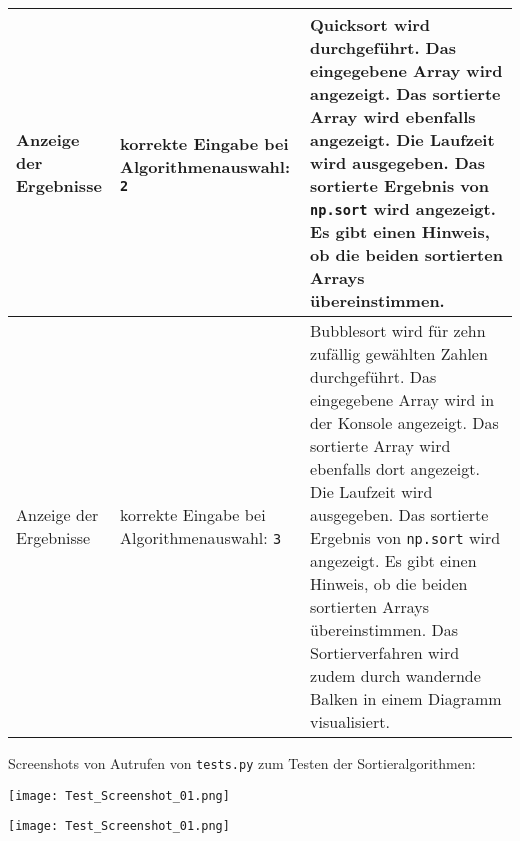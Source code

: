 \documentclass[a4paper]{article}
\begin{document}
\begin{exercise}{1}
\begin{center}
\begin{tabular}{| p{2.5cm} | p{3.2cm} | p{9cm} |}
		Anzeige der Ergebnisse & korrekte Eingabe bei Algorithmenauswahl: \newline \texttt{2}
		& Quicksort wird durchgef\"uhrt. Das eingegebene Array wird angezeigt. Das sortierte
		Array wird ebenfalls angezeigt. Die Laufzeit wird ausgegeben. Das sortierte Ergebnis von
		\texttt{np.sort} wird angezeigt. Es gibt einen Hinweis, ob die beiden sortierten Arrays
		\"ubereinstimmen. \\ \hline
		
		Anzeige der Ergebnisse & korrekte Eingabe bei Algorithmenauswahl: \newline \texttt{3}
		& Bubblesort wird f\"ur zehn zuf\"allig gew\"ahlten Zahlen durchgef\"uhrt. Das eingegebene
		Array wird in der Konsole angezeigt. Das sortierte Array wird ebenfalls dort angezeigt. Die
		Laufzeit wird ausgegeben. Das sortierte Ergebnis von \texttt{np.sort} wird angezeigt.
		Es gibt einen Hinweis, ob die beiden sortierten Arrays \"ubereinstimmen.
		Das Sortierverfahren wird zudem durch wandernde Balken in einem Diagramm
		visualisiert. \\ \hline	
		\end{tabular}
	\end{center}

\newpage

	Screenshots von Autrufen von \texttt{tests.py} zum Testen der Sortieralgorithmen:

	\begin{center}
		\texttt{[image: Test\_Screenshot\_01.png]}
	\end{center}
	\vspace*{1ex}
	\begin{center}
		\texttt{[image: Test\_Screenshot\_01.png]}
	\end{center}

\end{exercise}
\end{document}
